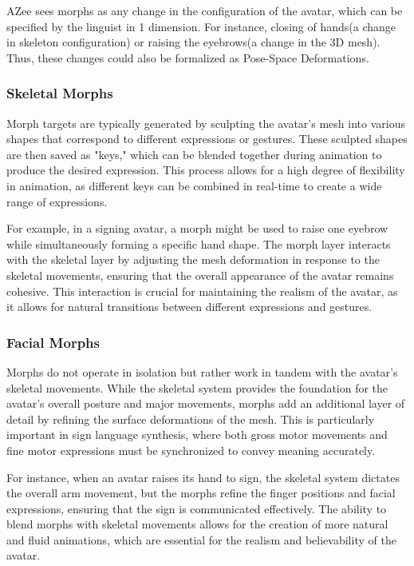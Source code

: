 \documentclass[../../main.tex]{subfiles}
\begin{document}
AZee sees morphs as any change in the configuration of the avatar, which can be specified by the linguist in 1 dimension. For instance, closing of hands(a change in skeleton configuration) or raising the eyebrows(a change in the 3D mesh). Thus, these changes could also be formalized as Pose-Space Deformations.

\subsubsection{Skeletal Morphs}
\label{subsec:skel_morphs}

Morph targets are typically generated by sculpting the avatar's mesh into various shapes that correspond to different expressions or gestures. These sculpted shapes are then saved as "keys," which can be blended together during animation to produce the desired expression. This process allows for a high degree of flexibility in animation, as different keys can be combined in real-time to create a wide range of expressions.

For example, in a signing avatar, a morph might be used to raise one eyebrow while simultaneously forming a specific hand shape. The morph layer interacts with the skeletal layer by adjusting the mesh deformation in response to the skeletal movements, ensuring that the overall appearance of the avatar remains cohesive. This interaction is crucial for maintaining the realism of the avatar, as it allows for natural transitions between different expressions and gestures.

\subsubsection{Facial Morphs}
\label{subsubsec:facial_morphs}

Morphs do not operate in isolation but rather work in tandem with the avatar's skeletal movements. While the skeletal system provides the foundation for the avatar's overall posture and major movements, morphs add an additional layer of detail by refining the surface deformations of the mesh. This is particularly important in sign language synthesis, where both gross motor movements and fine motor expressions must be synchronized to convey meaning accurately.

For instance, when an avatar raises its hand to sign, the skeletal system dictates the overall arm movement, but the morphs refine the finger positions and facial expressions, ensuring that the sign is communicated effectively. The ability to blend morphs with skeletal movements allows for the creation of more natural and fluid animations, which are essential for the realism and believability of the avatar.
\end{document}

